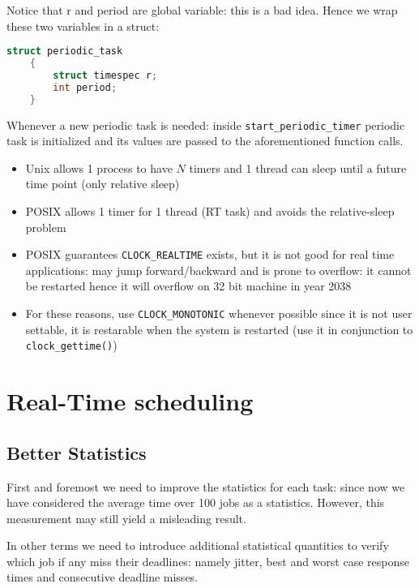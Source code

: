 Notice that r and period are global variable: this is a bad idea. Hence we wrap these two variables in a struct:
\begin{lstlisting}[language=C]
    struct periodic_task
    {
        struct timespec r;
        int period;
    }
\end{lstlisting}
Whenever a new periodic task is needed: inside \texttt{start\_periodic\_timer} periodic task is initialized and its values are passed to the aforementioned function calls.

\vfill
{}
\begin{itemize}
    \item Unix allows 1 process to have $N$ timers and 1 thread can sleep until a future time point (only relative sleep)
    \item POSIX allows 1 timer for 1 thread (RT task) and avoids the relative-sleep problem
    \item POSIX guarantees \texttt{CLOCK\_REALTIME} exists, but it is not good for real time applications: may jump forward/backward and is prone to overflow: it cannot be restarted hence it will overflow on 32 bit machine in year 2038
    \item For these reasons, use \texttt{CLOCK\_MONOTONIC} whenever possible since it is not user settable, it is restarable when the system is restarted (use it in conjunction to \texttt{clock\_gettime()})
\end{itemize}

\section{Real-Time scheduling}
\subsection{Better Statistics}
First and foremost we need to improve the statistics for each task: since now we have considered the average time over 100 jobs as a statistics. However, this measurement may still yield a misleading result.

In other terms we need to introduce additional statistical quantities to verify which job if any miss their deadlines: namely jitter, best and worst case response times and consecutive deadline misses.

